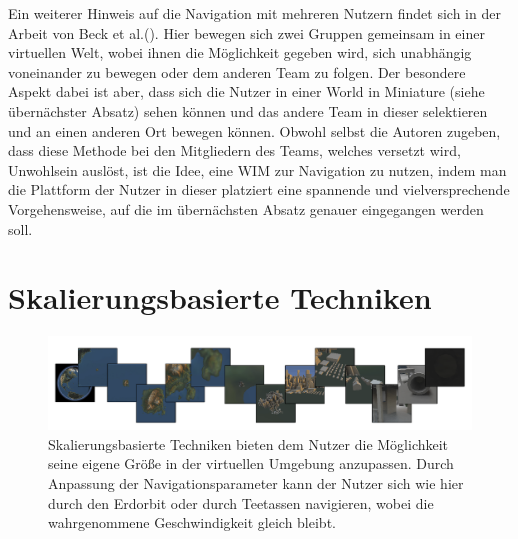 Ein weiterer Hinweis auf die Navigation mit mehreren Nutzern findet sich in der Arbeit von Beck et al.(\cite{BeckImmersiveTelepresence}). Hier bewegen sich zwei Gruppen gemeinsam in einer virtuellen Welt, wobei ihnen die Möglichkeit gegeben wird, sich unabhängig voneinander zu bewegen oder dem anderen Team zu folgen. Der besondere Aspekt dabei ist aber, dass sich die Nutzer in einer World in Miniature (siehe übernächster Absatz) sehen können und das andere Team in dieser selektieren und an einen anderen Ort bewegen können. Obwohl selbst die Autoren zugeben, dass diese Methode bei den Mitgliedern des Teams, welches versetzt wird, Unwohlsein auslöst, ist die Idee, eine WIM zur Navigation zu nutzen, indem man die Plattform der Nutzer in dieser platziert eine spannende und vielversprechende Vorgehensweise, auf die im übernächsten Absatz genauer eingegangen werden soll. 



\section{Skalierungsbasierte Techniken}

\begin{figure}[h]
  \centering
  \includegraphics[width=\textwidth]{images/skalierung.png}
  \caption{Skalierungsbasierte Techniken bieten dem Nutzer die Möglichkeit seine eigene Größe in der virtuellen Umgebung anzupassen. Durch Anpassung der Navigationsparameter kann der Nutzer sich wie hier durch den Erdorbit oder durch Teetassen navigieren, wobei die wahrgenommene Geschwindigkeit gleich bleibt. \cite{McCrae2009MultiscaleNavigation}}
  \label{fig:todo}
\end{figure}

